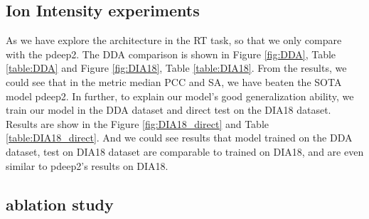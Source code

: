 \subsection{Ion Intensity experiments}
As we have explore the architecture in the RT task, so that we only compare with the pdeep2.
The DDA comparison is shown in Figure \ref{fig:DDA}, Table \ref{table:DDA} and Figure \ref{fig:DIA18},
Table \ref{table:DIA18}.
From the results, we could see that in the metric median PCC and SA, we have beaten the SOTA model
pdeep2. In further, to explain our model's good generalization ability, we train our model in the DDA
dataset and direct test on the DIA18 dataset. Results are show in the Figure \ref{fig:DIA18_direct} and Table \ref{table:DIA18_direct}.
And we could see results that model trained on the DDA dataset, test on DIA18 dataset are comparable to trained
on DIA18, and are even similar to pdeep2's results on DIA18.

\subsection{ablation study}

